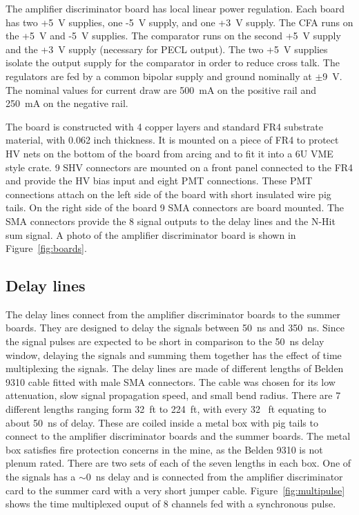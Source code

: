 \documentclass[review,number,sort&compress]{elsarticle}
\begin{document}
The amplifier discriminator board has local linear power regulation.
Each board has two +5~V supplies, one -5~V supply, and one +3~V supply.
The CFA runs on the +5~V and -5~V supplies. The comparator runs on the
second +5~V supply and the +3~V supply (necessary for PECL output).
The two +5~V supplies isolate the output supply for
the comparator in order to reduce cross talk. The regulators are fed
by a common bipolar supply and ground nominally at $\pm$9~V. The
nominal values for current draw are 500~mA on the positive rail and
250~mA on the negative rail.

The board is constructed with 4 copper layers and standard FR4
substrate material, with 0.062 inch thickness. It is mounted on a piece
of FR4 to protect HV nets on the bottom of the board from arcing and
to fit it into a 6U VME style crate. 9 SHV connectors are mounted on
a front panel connected to the FR4 and provide the HV bias input and
eight PMT connections. These PMT connections attach on the left side
of the board with short insulated wire pig tails. On the right
side of the board 9 SMA connectors are board mounted. The SMA
connectors provide the 8 signal outputs to the delay lines and the
N-Hit sum signal. A photo of the amplifier discriminator
board is shown in Figure~\ref{fig:boards}.

\subsection{Delay lines}
\label{sec:Delay}
%
The delay lines connect from the amplifier discriminator boards to the
summer boards. They are designed to delay the signals between 50~ns and 350~ns.
Since the signal pulses are expected to be short in
comparison to the 50~ns delay window, delaying the signals and summing
them together has the effect of time multiplexing the signals. The
delay lines are made of different lengths of Belden 9310 cable fitted
with male SMA connectors. The cable was chosen for its low
attenuation, slow signal propagation speed, and small bend radius.
There are 7 different lengths ranging form 32~ft to 224~ft, with every 32~ ft
equating to about 50~ns of delay. These are coiled inside a metal box
with pig tails to connect to the amplifier discriminator boards and
the summer boards. The metal box satisfies fire protection concerns
in the mine, as the Belden 9310 is not plenum rated. There are two
sets of each of the seven lengths in each box. One of the signals has
a $\sim$0~ns delay and is connected from the amplifier discriminator card to
the summer card with a very short jumper cable. Figure~\ref{fig:multipulse}
shows the time multiplexed ouput of 8 channels fed with a synchronous pulse.
\end{document}
